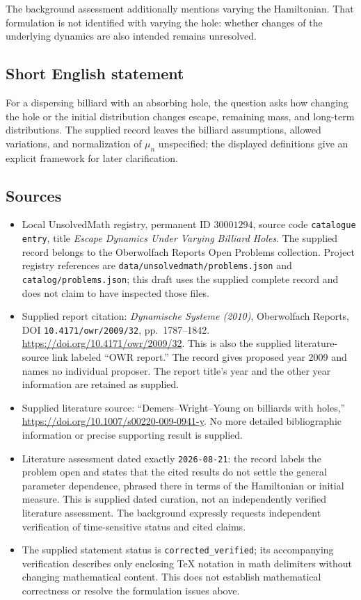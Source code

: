 \documentclass[11pt]{article}
\begin{document}
The background assessment additionally mentions varying the Hamiltonian. That formulation is not identified with varying the hole: whether changes of the underlying dynamics are also intended remains unresolved.
\subsection{Short English statement}
For a dispersing billiard with an absorbing hole, the question asks how changing the hole or the initial distribution changes escape, remaining mass, and long-term distributions. The supplied record leaves the billiard assumptions, allowed variations, and normalization of \(\mu_n\) unspecified; the displayed definitions give an explicit framework for later clarification.
\subsection{Sources}
\begin{itemize}
\item Local UnsolvedMath registry, permanent ID \(30001294\), source code \texttt{catalogue entry}, title \emph{Escape Dynamics Under Varying Billiard Holes}. The supplied record belongs to the Oberwolfach Reports Open Problems collection. Project registry references are \texttt{data/unsolvedmath/problems.json} and \texttt{catalog/problems.json}; this draft uses the supplied complete record and does not claim to have inspected those files.
\item Supplied report citation: \emph{Dynamische Systeme (2010)}, Oberwolfach Reports, DOI \texttt{10.4171/owr/2009/32}, pp.\ 1787--1842. \url{https://doi.org/10.4171/owr/2009/32}. This is also the supplied literature-source link labeled ``OWR report.'' The record gives proposed year 2009 and names no individual proposer. The report title's year and the other year information are retained as supplied.
\item Supplied literature source: ``Demers--Wright--Young on billiards with holes,'' \url{https://doi.org/10.1007/s00220-009-0941-y}. No more detailed bibliographic information or precise supporting result is supplied.
\item Literature assessment dated exactly \texttt{2026-08-21}: the record labels the problem open and states that the cited results do not settle the general parameter dependence, phrased there in terms of the Hamiltonian or initial measure. This is supplied dated curation, not an independently verified literature assessment. The background expressly requests independent verification of time-sensitive status and cited claims.
\item The supplied statement status is \texttt{corrected\_verified}; its accompanying verification describes only enclosing TeX notation in math delimiters without changing mathematical content. This does not establish mathematical correctness or resolve the formulation issues above.
\end{itemize}
\end{document}
